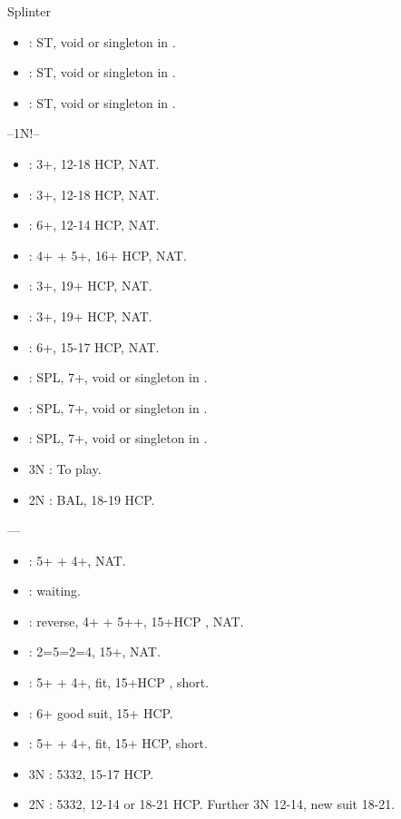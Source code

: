 \documentclass[12pt,twoside,a5paper]{report}%
\begin{document}
	Splinter
	\begin{itemize}
	\renewcommand{\labelitemi}{}
	\item {} : ST, void or singleton in \cl{}.
	\item {} : ST, void or singleton in \di{}.
	\item {} : ST, void or singleton in \sp{}.
	\end{itemize}

	--1N!--
	\begin{itemize}
	\renewcommand{\labelitemi}{}
	\item {} : 3+\cl{}, 12-18 HCP, NAT.
	\item {} : 3+\di{}, 12-18 HCP, NAT.
	\item {} : 6+\he{}, 12-14 HCP, NAT.
	\item {} : 4+\sp{} + 5+\he{}, 16+ HCP, NAT.
	\item {} : 3+\cl{}, 19+ HCP, NAT.
	\item {} : 3+\di{}, 19+ HCP, NAT.
	\item {} : 6+\he{}, 15-17 HCP, NAT.
	\item {} : SPL, 7+\he{}, void or singleton in \sp{}. 
	\item {} : SPL, 7+\he{}, void or singleton in \cl{}.
	\item {} : SPL, 7+\he{}, void or singleton in \di{}.
	\item 3N : To play.
	\item 2N : BAL, 18-19 HCP.
	\end{itemize}

	----
	\begin{itemize}
	\renewcommand{\labelitemi}{}
	\item {} : 5+\he{} + 4+\di{}, NAT.
	\item {} : waiting.
	\item {} : reverse, 4+\sp{} + 5+\he{}+, 15+HCP , NAT.
	\item {} : 2=5=2=4, 15+, NAT.
	\item {} : 5+\he{} + 4+\cl{}, fit, 15+HCP , short\di{}.
	\item {} : 6+\he{} good suit, 15+ HCP.
	\item {} : 5+\he{} + 4+\cl{}, fit, 15+ HCP, short\sp{}.
	\item 3N : 5332, 15-17 HCP.
	\item 2N : 5332, 12-14 or 18-21 HCP. Further 3N 12-14, new suit 18-21.
	\end{itemize}
\end{document}
